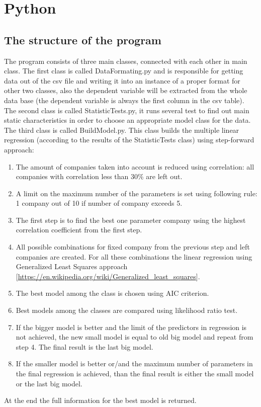 \documentclass{article}
\begin{document}
\newpage
\section{Python}
\subsection{The structure of the program}
The program consists of three main classes, connected with each other in main class. The first class is called DataFormating.py and is responsible for getting data out of the csv file and writing it into an instance of a proper format for other two classes, also the dependent variable will be extracted from the whole data base (the dependent variable is always the first column in the csv table).\\
The second class is called StatisticTests.py, it runs several test to find out main static characteristics in order to choose an appropriate model class for the data.\\
The third class is called BuildModel.py. This class builds the multiple linear regression (according to the results of the StatisticTests class) using step-forward approach:
\begin{enumerate}
    \item The amount of companies taken into account is reduced using correlation: all companies with correlation less than 30\% are left out.
    \item A limit on the maximum number of the parameters is set using following rule: 1 company out of 10 if number of company exceeds 5.
    \item The first step is to find the best one parameter company using the highest correlation coefficient from the first step.
    \item All possible combinations for fixed company from the previous step and left companies are created. For all these combinations the linear regression using Generalized Least Squares approach [\url{https://en.wikipedia.org/wiki/Generalized_least_squares}].
    \item The best model among the class is chosen using AIC criterion.
    \item Best models among the classes are compared using likelihood ratio test. 
    \item If the bigger model is better and the limit of the predictors in regression is not achieved, the new small model is equal to old big model and repeat from step 4. The final result is the last big model.
    \item If the smaller model is better or/and the maximum number of parameters in the final regression is achieved, than the final result is either the small model or the last big model. 
\end{enumerate} 
At the end the full information for the best model is returned.
\end{document}
